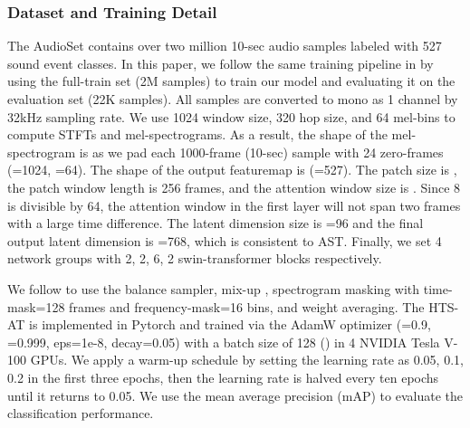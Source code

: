 \documentclass{article}
\begin{document}
\subsubsection{Dataset and Training Detail}
\vspace{-0.1cm}
The AudioSet contains over two million 10-sec audio samples labeled with 527 sound event classes. In this paper, we follow the same training pipeline in \cite{pann,psla,ast} by using the full-train set (2M samples) to train our model and evaluating it on the evaluation set (22K samples). All samples are converted to mono as 1 channel by 32kHz sampling rate. We use 1024 window size, 320 hop size, and 64 mel-bins to compute STFTs and mel-spectrograms. As a result, the shape of the mel-spectrogram is  as we pad each 1000-frame (10-sec) sample with 24 zero-frames (=1024, =64). The shape of the output featuremap is  (=527). The patch size is , the patch window length is 256 frames, and the attention window size is . Since 8 is divisible by 64, the attention window in the first layer will not span two frames with a large time difference. The latent dimension size is =96 and the final output latent dimension is =768, which is consistent to AST. Finally, we set 4 network groups with 2, 2, 6, 2 swin-transformer blocks respectively. 

We follow \cite{pann,psla} to use the balance sampler,  mix-up \cite{mixup}, spectrogram masking \cite{specaugment} with time-mask=128 frames and frequency-mask=16 bins, and weight averaging. The HTS-AT is implemented in Pytorch and trained via the AdamW optimizer (=0.9, =0.999, eps=1e-8, decay=0.05) with a batch size of 128 () in 4 NVIDIA Tesla V-100 GPUs. We apply a warm-up schedule by setting the learning rate as 0.05, 0.1, 0.2 in the first three epochs, then the learning rate is halved every ten epochs until it returns to 0.05. We use the mean average precision (mAP) to evaluate the classification performance.


\linespread{1.1}
\begin{table}[t]
\centering
{}
\caption{The accuracy score results on ESC-50 dataset and Speech Command V2 (SCV2).}
\label{tab:exp-esc-scv2}
\vspace{-0.5cm}
\end{table}
\end{document}
